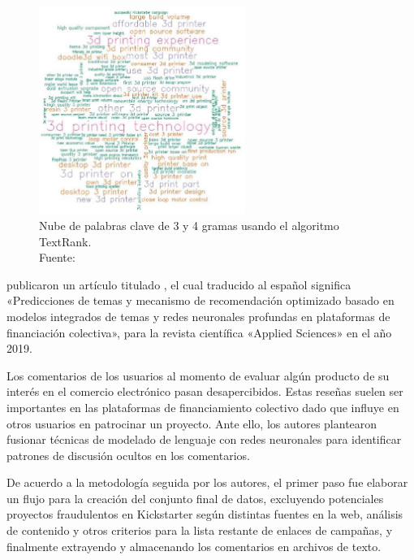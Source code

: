 \begin{figure}[!ht]
	\begin{center}
		\includegraphics[width=0.60\textwidth]{2/figures/chaichi2019.jpg}
		\caption[Nube de palabras clave de 3 y 4 gramas usando el algoritmo TextRank]{Nube de palabras clave de 3 y 4 gramas usando el algoritmo TextRank.\\
		Fuente: \cite{pr_chaichi2019nlp_3dprinting}}
		\label{2:fig127}
	\end{center}
\end{figure}

\newpage
\cite{pr_shafqat2019topicpredictions} publicaron un artículo titulado , el cual traducido al español significa «Predicciones de temas y mecanismo de recomendación optimizado basado en modelos integrados de temas y redes neuronales profundas en plataformas de financiación colectiva», para la revista científica «Applied Sciences» en el año 2019.

Los comentarios de los usuarios al momento de evaluar algún producto de su interés en el comercio electrónico pasan desapercibidos. Estas reseñas suelen ser importantes en las plataformas de financiamiento colectivo dado que influye en otros usuarios en patrocinar un proyecto. Ante ello, los autores plantearon fusionar técnicas de modelado de lenguaje con redes neuronales para identificar patrones de discusión ocultos en los comentarios.

De acuerdo a la metodología seguida por los autores, el primer paso fue elaborar un flujo para la creación del conjunto final de datos, excluyendo potenciales proyectos fraudulentos en Kickstarter según distintas fuentes en la web, análisis de contenido y otros criterios para la lista restante de enlaces de campañas, y finalmente extrayendo y almacenando los comentarios en archivos de texto.

